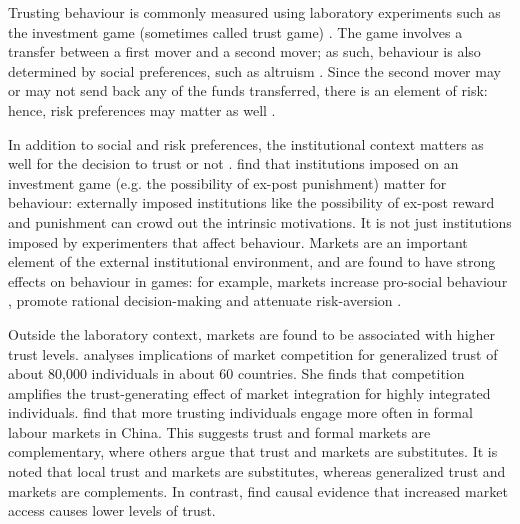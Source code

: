 Trusting behaviour is commonly measured using laboratory experiments such as the investment game (sometimes called trust game) \citep{Berg1995,Glaeser2000b}. The game involves a transfer between a first mover and a second mover; as such, behaviour is also determined by social preferences, such as altruism \citep{Ashraf2006,Cox2004}. Since the second mover may or may not send back any of the funds transferred, there is an element of risk: hence, risk preferences may matter as well \citep{Karlan2005,Bohnet2004,Bohnet2008}.

In addition to social and risk preferences, the institutional context matters as well for the decision to trust or not \citep{Tamilina2013a}. \cite{Bohnet2007} find that institutions imposed on an investment game (e.g. the possibility of ex-post punishment) matter for behaviour: externally imposed institutions like the possibility of ex-post reward and punishment can crowd out the intrinsic motivations. It is not just institutions imposed by experimenters that affect behaviour. Markets are an important element of the external institutional environment, and are found to have strong effects on behaviour in games: for example, markets increase pro-social behaviour \cite{Henrich2005,Henrich2010}, promote rational decision-making \citep{List2008,Cecchi2013,Braga2009} and attenuate risk-aversion \citep{Melesse2015}. 

Outside the laboratory context, markets are found to be associated with higher trust levels. \cite{Fischer2008} analyses implications of market competition for generalized trust of about 80,000 individuals in about 60 countries. She finds that competition amplifies the trust-generating effect of market integration for highly integrated individuals. \cite{Tu2010} find that more trusting individuals engage more often in formal labour markets in China. This suggests trust and formal markets are complementary, where others argue that trust and markets are substitutes. It is noted that local trust and markets are substitutes, whereas generalized trust and markets are complements. In contrast,  \cite{Siziba2012} find causal evidence that increased market access causes lower levels of trust. 

